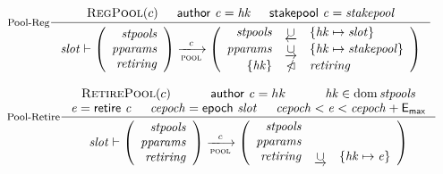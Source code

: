 \begin{figure}
  \begin{equation}\label{eq:pool-reg}
    \inference[Pool-Reg]
    {
      \RegPool{c}
      & \cauthor{c} = \var{hk}
      & \stakepool{c} = \var{stakepool}
    }
    {
      \var{slot} \vdash
      \left(
      \begin{array}{r}
        \var{stpools} \\
        \var{pparams} \\
        \var{retiring}
      \end{array}
      \right)
      \trans{pool}{c}
      \left(
      \begin{array}{rcl}
        \var{stpools} & \unionoverrideLeft
                      & \{\var{hk} \mapsto \var{slot}\} \\
        \var{pparams} & \unionoverrideRight
                      & \{\var{hk} \mapsto \var{stakepool}\} \\
        \{\var{hk}\} & \subtractdom & \var{retiring} \\
      \end{array}
      \right)
    }
  \end{equation}


  \begin{equation}\label{eq:pool-ret}
    \inference[Pool-Retire]
    {
    \RetirePool{c}
    & \cauthor{c} = hk
    & \var{hk} \in \dom \var{stpools} \\
    \var{e} = \retire{c}
    & \var{cepoch} = \epoch{slot}
    & \var{cepoch} < \var{e} < \var{cepoch} + \emax
  }
  {
    \var{slot} \vdash
    \left(
      \begin{array}{r}
        \var{stpools} \\
        \var{pparams} \\
        \var{retiring}
      \end{array}
    \right)
    \trans{pool}{c}
    \left(
      \begin{array}{rcl}
        \var{stpools} \\
        \var{pparams} \\
        \var{retiring} & \unionoverrideRight & \{\var{hk} \mapsto \var{e}\} \\
      \end{array}
    \right)
  }
  \end{equation}


\end{figure}
